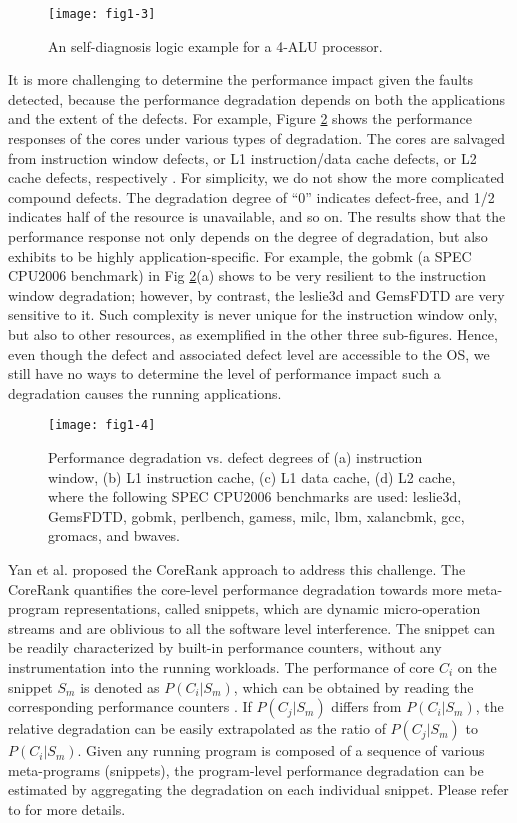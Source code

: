 \begin{figure}[t]
\centering
\texttt{[image: fig1-3]}
\caption{An self-diagnosis logic example for a 4-ALU processor.}
\label{fig:self-diagnosis-example} 
\end{figure}

It is more challenging to determine the performance impact given the faults detected, because the performance degradation depends on both the applications and the extent of the defects. For example, Figure \ref{fig:performance-degradation} shows the performance responses of the cores under various types of degradation. The cores are salvaged from instruction window defects, or L1 instruction/data cache defects, or L2 cache defects, respectively \cite{salvaging}. For simplicity, we do not show the more complicated compound defects. The degradation degree of “0” indicates defect-free, and 1/2 indicates half of the resource is unavailable, and so on. The results show that the performance response not only depends on the degree of degradation, but also exhibits to be highly application-specific. For example, the gobmk (a SPEC CPU2006 benchmark) in Fig \ref{fig:performance-degradation}(a) shows to be very resilient to the instruction window degradation; however, by contrast, the leslie3d and GemsFDTD are very sensitive to it. Such complexity is never unique for the instruction window only, but also to other resources, as exemplified in the other three sub-figures. Hence, even though the defect and associated defect level are accessible to the OS, we still have no ways to determine the level of performance impact such a degradation causes the running applications.

\begin{figure}[t]
\centering
\texttt{[image: fig1-4]}
\caption{Performance degradation vs. defect degrees of (a) instruction window, (b) L1 instruction cache, (c) L1 data cache, (d) L2 cache, where the following SPEC CPU2006 benchmarks are used: leslie3d, GemsFDTD, gobmk, perlbench, gamess, milc, lbm, xalancbmk, gcc, gromacs, and bwaves.}
\label{fig:performance-degradation} 
\end{figure}


Yan et al. \cite{yan2015corerank} proposed the CoreRank approach to address this challenge. The CoreRank quantifies the core-level performance degradation towards more meta-program representations, called snippets, which are dynamic micro-operation streams and are oblivious to all the software level interference. The snippet can be readily characterized by built-in performance counters, without any instrumentation into the running workloads. The performance of core $C_i$ on the snippet $S_m$ is denoted as $P(C_{i}|S_{m})$, which can be obtained by reading the corresponding performance counters \cite{eyerman2007top}. If $P(C_{j}|S_{m})$ differs from $P(C_{i}|S_{m})$, the relative degradation can be easily extrapolated as the ratio of $P(C_{j}|S_{m})$ to $P(C_{i}|S_{m})$. Given any running program is composed of a sequence of various meta-programs (snippets), the program-level performance degradation can be estimated by aggregating the degradation on each individual snippet. Please refer to \cite{yan2015corerank} for more details.

